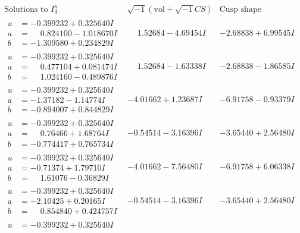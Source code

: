 \documentclass[1p]{elsarticle_modified}
\theoremstyle{definition}
\newcommand{\I}{\sqrt{-1}}
\begin{document}
$$\begin{array}{c|c|c}  
\text{Solutions to }I^u_{3}& \I (\text{vol} + \sqrt{-1}CS) & \text{Cusp shape}\\
 \hline 
\begin{aligned}
u &= -0.399232 + 0.325640 I \\
a &= \phantom{-}0.824100 - 1.018670 I \\
b &= -1.309580 + 0.234829 I\end{aligned}
 & \phantom{-}1.52684 - 4.69454 I & -2.68838 + 6.99545 I \\ \hline\begin{aligned}
u &= -0.399232 + 0.325640 I \\
a &= \phantom{-}0.477104 + 0.081474 I \\
b &= \phantom{-}1.024160 - 0.489876 I\end{aligned}
 & \phantom{-}1.52684 - 1.63338 I & -2.68838 - 1.86585 I \\ \hline\begin{aligned}
u &= -0.399232 + 0.325640 I \\
a &= -1.37182 - 1.14774 I \\
b &= -0.894007 + 0.844829 I\end{aligned}
 & -4.01662 + 1.23687 I & -6.91758 - 0.93379 I \\ \hline\begin{aligned}
u &= -0.399232 + 0.325640 I \\
a &= \phantom{-}0.76466 + 1.68764 I \\
b &= -0.774417 + 0.765734 I\end{aligned}
 & -0.54514 - 3.16396 I & -3.65440 + 2.56480 I \\ \hline\begin{aligned}
u &= -0.399232 + 0.325640 I \\
a &= -0.71374 + 1.79710 I \\
b &= \phantom{-}1.61076 - 0.36829 I\end{aligned}
 & -4.01662 - 7.56480 I & -6.91758 + 6.06338 I \\ \hline\begin{aligned}
u &= -0.399232 + 0.325640 I \\
a &= -2.10425 + 0.20165 I \\
b &= \phantom{-}0.854840 + 0.424757 I\end{aligned}
 & -0.54514 - 3.16396 I & -3.65440 + 2.56480 I \\ \hline\begin{aligned}
u &= -0.399232 + 0.325640 I \\

\end{aligned}
\end{array}$$
\end{document}
